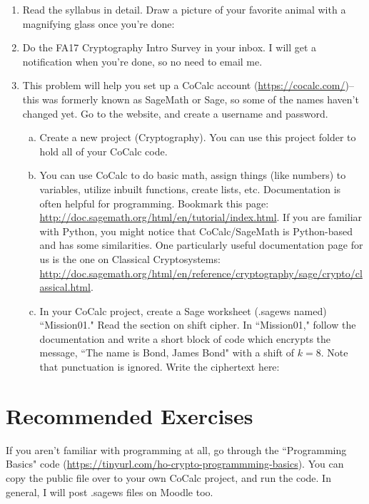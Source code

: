 \documentclass[12pt]{amsart}
\theoremstyle{plain}
\theoremstyle{definition}
\begin{document}
\begin{enumerate}[1.]
	\item Read the syllabus in detail.  Draw a picture of your favorite animal with a magnifying glass once you're done:
	\begin{framed}
	\vspace{1in}
	\end{framed}
	\item Do the FA17 Cryptography Intro Survey in your inbox.  I will get a notification when you're done, so no need to email me.\\
	
	\item This problem will help you set up a CoCalc account (\url{https://cocalc.com/})--this was formerly known as SageMath or Sage, so some of the names haven't changed yet.  Go to the website, and create a username and password.\\
		\begin{enumerate}[a.]
			\item Create a new project (Cryptography).  You can use this project folder to hold all of your CoCalc code.\\
			\item You can use CoCalc to do basic math, assign things (like numbers) to variables, utilize inbuilt functions, create lists, etc.  Documentation is often helpful for programming.  Bookmark this page: \url{http://doc.sagemath.org/html/en/tutorial/index.html}.  If you are familiar with Python, you might notice that CoCalc/SageMath is Python-based and has some similarities.  One particularly useful documentation page for us is the one on Classical Cryptosystems: \url{http://doc.sagemath.org/html/en/reference/cryptography/sage/crypto/classical.html}.\\
			\item In your CoCalc project, create a Sage worksheet (.sagews named) ``Mission01."  Read the section on shift cipher.  In ``Mission01," follow the documentation and write a short block of code which encrypts the message, ``The name is Bond, James Bond" with a shift of $k = 8$.  Note that punctuation is ignored.  Write the ciphertext here:
		\begin{framed}
		\vspace{1in}
		\end{framed}
		\end{enumerate}
\end{enumerate}

\section{Recommended Exercises}
\noindent
If you aren't familiar with programming at all, go through the ``Programming Basics" code (\url{https://tinyurl.com/ho-crypto-programmming-basics}).  You can copy the public file over to your own CoCalc project, and run the code.  In general, I will post .sagews files on Moodle too.
	
\end{document}
